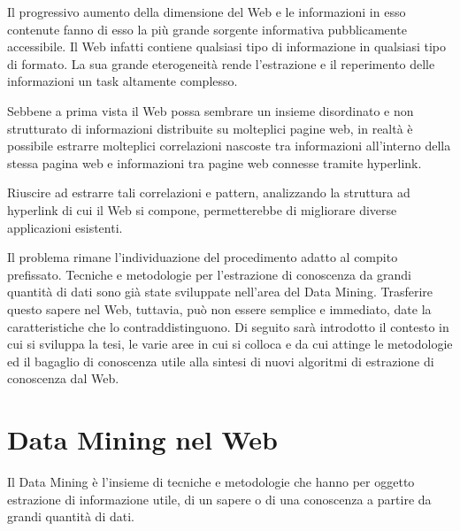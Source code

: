 


Il progressivo aumento della dimensione del Web e le informazioni in esso contenute fanno di esso la più grande sorgente informativa pubblicamente accessibile. Il Web infatti contiene qualsiasi tipo di informazione in qualsiasi tipo di formato. 
La sua grande eterogeneità rende l'estrazione e il reperimento delle informazioni un task altamente complesso. 

Sebbene a prima vista il Web possa sembrare un insieme disordinato e non strutturato di informazioni distribuite su molteplici pagine web, in realtà è possibile estrarre molteplici correlazioni nascoste tra informazioni all'interno della stessa pagina web e informazioni tra pagine web connesse tramite hyperlink.

Riuscire ad estrarre tali correlazioni e pattern, analizzando la struttura ad hyperlink di cui il Web si compone, permetterebbe di migliorare diverse applicazioni esistenti.

Il problema rimane l'individuazione del procedimento adatto al compito prefissato. Tecniche e metodologie per l'estrazione di conoscenza da grandi quantità di dati sono già state sviluppate nell'area del Data Mining. Trasferire questo sapere nel Web, tuttavia, può non essere semplice e immediato, date la caratteristiche che lo contraddistinguono. 
Di seguito sarà introdotto il contesto in cui si sviluppa la tesi, le varie aree in cui si colloca e da cui attinge le metodologie ed il bagaglio di conoscenza utile alla sintesi di nuovi algoritmi di estrazione di conoscenza dal Web.

\section{Data Mining nel Web}
Il Data Mining è l'insieme di tecniche e metodologie che hanno per oggetto estrazione di informazione utile, di un sapere o di una conoscenza a partire da grandi quantità di dati.

